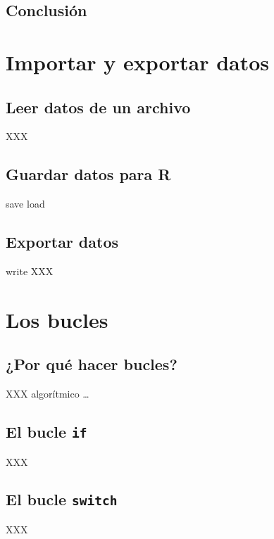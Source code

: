 \documentclass[]{book}
\begin{document}
\section{Conclusión}\label{conclusion-4}

\chapter{Importar y exportar datos}\label{import}

\section{Leer datos de un archivo}\label{leer-datos-de-un-archivo}

XXX

\section{Guardar datos para R}\label{guardar-datos-para-r}

save load

\section{Exportar datos}\label{exportar-datos}

write XXX

\chapter{Los bucles}\label{loops}

\section{¿Por qué hacer bucles?}\label{por-que-hacer-bucles}

XXX algorítmico \ldots{}

\section{\texorpdfstring{El bucle
\texttt{if}}{El bucle if}}\label{el-bucle-if}

XXX

\section{\texorpdfstring{El bucle
\texttt{switch}}{El bucle switch}}\label{el-bucle-switch}

XXX
\end{document}
